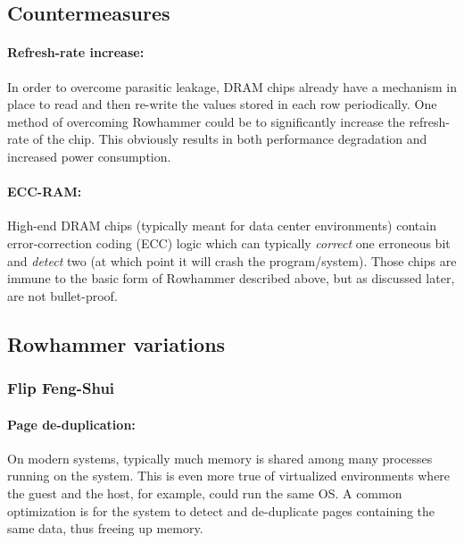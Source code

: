 \subsection{Countermeasures} \label{subsec:countermeasures}
\paragraph{Refresh-rate increase:} In order to overcome parasitic leakage, DRAM chips already have a mechanism in place to read and then re-write the values stored in each row periodically. One method of overcoming Rowhammer could be to significantly increase the refresh-rate of the chip. This obviously results in both performance degradation and increased power consumption.

\paragraph{ECC-RAM:} High-end DRAM chips (typically meant for data center environments) contain error-correction coding (ECC) logic which can typically \emph{correct} one erroneous bit and \emph{detect} two (at which point it will crash the program/system). Those chips are immune to the basic form of Rowhammer described above, but as discussed later, are not bullet-proof.

\subsection{Rowhammer variations} \label{subsec:rowhammer_variations}
\subsubsection{Flip Feng-Shui} \label{subsubsec:flip_feng_shui}
\paragraph{Page de-duplication:} On modern systems, typically much memory is shared among many processes running on the system. This is even more true of virtualized environments where the guest and the host, for example, could run the same OS. A common optimization is for the system to detect and de-duplicate pages containing the same data, thus freeing up memory.
